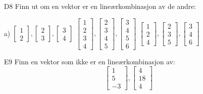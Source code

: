 \documentclass[a4paper,norsk,11pt]{interaktiv}
\begin{document}
\begin{oppgave}{D8}
Finn ut om en vektor er en lineærkombinasjon av de andre:

a) \quad
$
\begin{bmatrix}
1\\
2
\end{bmatrix},
\begin{bmatrix}
2\\
3
\end{bmatrix},
\begin{bmatrix}
3\\
4
\end{bmatrix}
$
\quad
{}
\quad
	$
	\begin{bmatrix}
	1\\
	2\\
	3\\
	4
	\end{bmatrix},
	\begin{bmatrix}
	2\\
	3\\
	4\\
	5
	\end{bmatrix},
	\begin{bmatrix}
	3\\
	4\\
	5\\
	6
	\end{bmatrix}
	$
	\quad
{}
\quad
	$
	\begin{bmatrix}
	1\\
	2\\
	4
	\end{bmatrix},
	\begin{bmatrix}
	2\\
	3\\
	5
	\end{bmatrix},
	\begin{bmatrix}
	3\\
	4\\
	6
	\end{bmatrix}
	$
\end{oppgave}


\begin{oppgave}{E9}
Finn en vektor som ikke er en lineærkombinasjon av:
%
	$$
	\begin{bmatrix}
	1\\
	5\\
	-3
	\end{bmatrix},
	\begin{bmatrix}
	4\\
	18\\
	4
	\end{bmatrix}
	$$

\end{oppgave}
\end{document}
